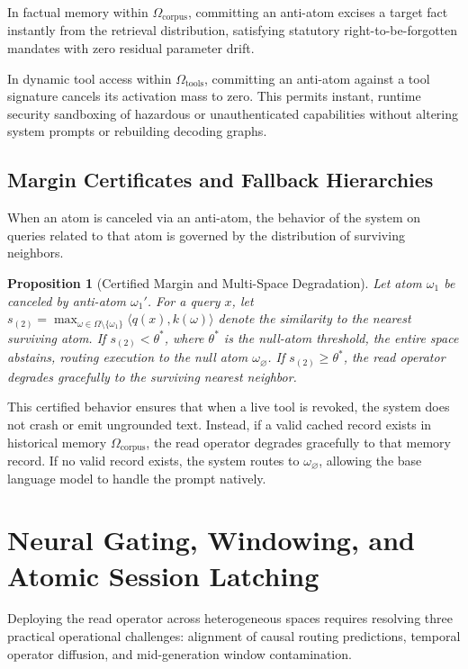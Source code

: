 \documentclass[preprint,12pt]{elsarticle}
\newtheorem{proposition}{Proposition}
\begin{document}
In factual memory within $\Omega_{\mathrm{corpus}}$, committing an anti-atom excises a target fact instantly from the retrieval distribution, satisfying statutory right-to-be-forgotten mandates with zero residual parameter drift.

In dynamic tool access within $\Omega_{\mathrm{tools}}$, committing an anti-atom against a tool signature cancels its activation mass to zero. This permits instant, runtime security sandboxing of hazardous or unauthenticated capabilities without altering system prompts or rebuilding decoding graphs.

\subsection{Margin Certificates and Fallback Hierarchies}

When an atom is canceled via an anti-atom, the behavior of the system on queries related to that atom is governed by the distribution of surviving neighbors.

\begin{proposition}[Certified Margin and Multi-Space Degradation]
Let atom $\omega_1$ be canceled by anti-atom $\omega_1'$. For a query $x$, let $s_{(2)} = \max_{\omega \in \Omega \setminus \{\omega_1\}} \langle q(x), k(\omega) \rangle$ denote the similarity to the nearest surviving atom. If $s_{(2)} < \theta^*$, where $\theta^*$ is the null-atom threshold, the entire space abstains, routing execution to the null atom $\omega_\varnothing$. If $s_{(2)} \ge \theta^*$, the read operator degrades gracefully to the surviving nearest neighbor.
\label{prop:margin}
\end{proposition}

This certified behavior ensures that when a live tool is revoked, the system does not crash or emit ungrounded text. Instead, if a valid cached record exists in historical memory $\Omega_{\mathrm{corpus}}$, the read operator degrades gracefully to that memory record. If no valid record exists, the system routes to $\omega_\varnothing$, allowing the base language model to handle the prompt natively.

\section{Neural Gating, Windowing, and Atomic Session Latching}

Deploying the read operator across heterogeneous spaces requires resolving three practical operational challenges: alignment of causal routing predictions, temporal operator diffusion, and mid-generation window contamination.
\end{document}
